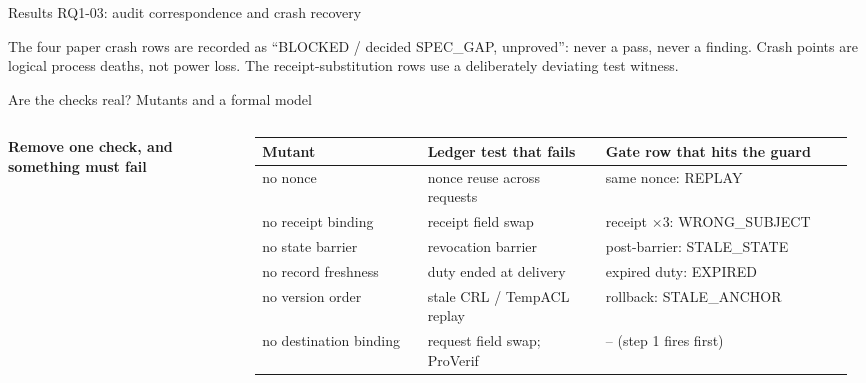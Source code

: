 \documentclass[aspectratio=169,10pt]{beamer}
\newcommand{\code}[1]{{\ttfamily\scriptsize #1}}
\begin{document}
\begin{frame}{Results RQ1-03: audit correspondence and crash recovery}
\vspace{0.4em}
\raggedright\tiny\color{datagray}
The four paper crash rows are recorded as ``BLOCKED / decided SPEC\_GAP, unproved'': never a pass, never a finding. Crash points are logical process deaths, not power loss. The receipt-substitution rows use a deliberately deviating test witness.
\end{frame}

\begin{frame}{Are the checks real? Mutants and a formal model}
\begin{columns}[T,onlytextwidth]
\footnotesize\textbf{Remove one check, and something must fail}\\[0.3em]
\scriptsize
\renewcommand{\arraystretch}{1.22}
\begin{tabular}{@{}L{0.26\linewidth} L{0.29\linewidth} L{0.39\linewidth}@{}}
\toprule
\textbf{Mutant} & \textbf{Ledger test that fails} & \textbf{Gate row that hits the guard} \\
\midrule
no nonce & nonce reuse across requests & same nonce: \code{REPLAY} \\
no receipt binding & receipt field swap & receipt $\times$3: \code{WRONG\_SUBJECT} \\
no state barrier & revocation barrier & post-barrier: \code{STALE\_STATE} \\
no record freshness & duty ended at delivery & expired duty: \code{EXPIRED} \\
no version order & stale CRL / TempACL replay & rollback: \code{STALE\_ANCHOR} \\
no destination binding & request field swap; ProVerif & -- (step 1 fires first) \\
\bottomrule
\end{tabular}\\[0.4em]


\end{columns}
\end{frame}
\end{document}
